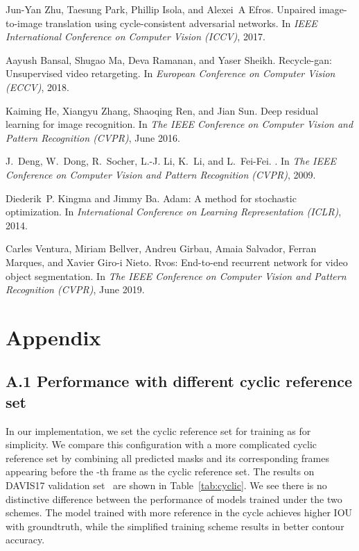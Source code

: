 \documentclass{article}
\begin{document}
{\begin{thebibliography}{10}
Jun-Yan Zhu, Taesung Park, Phillip Isola, and Alexei~A Efros.
\newblock Unpaired image-to-image translation using cycle-consistent
  adversarial networks.
\newblock In {\em IEEE International Conference on Computer Vision (ICCV)},
  2017.

Aayush Bansal, Shugao Ma, Deva Ramanan, and Yaser Sheikh.
\newblock Recycle-gan: Unsupervised video retargeting.
\newblock In {\em European Conference on Computer Vision (ECCV)}, 2018.

Kaiming He, Xiangyu Zhang, Shaoqing Ren, and Jian Sun.
\newblock Deep residual learning for image recognition.
\newblock In {\em The IEEE Conference on Computer Vision and Pattern
  Recognition (CVPR)}, June 2016.

J.~Deng, W.~Dong, R.~Socher, L.-J. Li, K.~Li, and L.~Fei-Fei.
.
\newblock In {\em The IEEE Conference on Computer Vision and Pattern
  Recognition (CVPR)}, 2009.

Diederik~P. Kingma and Jimmy Ba.
\newblock Adam: A method for stochastic optimization.
\newblock In {\em International Conference on Learning Representation (ICLR)},
  2014.

Carles Ventura, Miriam Bellver, Andreu Girbau, Amaia Salvador, Ferran Marques,
  and Xavier Giro-i Nieto.
\newblock Rvos: End-to-end recurrent network for video object segmentation.
\newblock In {\em The IEEE Conference on Computer Vision and Pattern
  Recognition (CVPR)}, June 2019.

\end{thebibliography}

}

\newpage

\section*{Appendix}

\subsection*{A.1 Performance with different cyclic reference set}
In our implementation, we set the cyclic reference set for training as  for simplicity. We compare this configuration with a more complicated cyclic reference set by combining all predicted masks and its corresponding frames appearing before the -th frame as the cyclic reference set. The results on DAVIS17 validation set~\cite{Pont-Tuset_arXiv_2017} are shown in Table~\ref{tab:cyclic}. We see there is no distinctive difference between the performance of models trained under the two schemes. The model trained with more reference in the cycle achieves higher IOU with groundtruth, while the simplified training scheme results in better contour accuracy.
\end{document}
